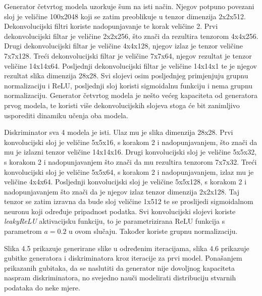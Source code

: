 \documentclass[times, utf8, diplomski]{fer}
\begin{document}
Generator četvrtog modela uzorkuje šum na isti način. Njegov potpuno povezani sloj je veličine 100x2048 koji se zatim preoblikuje u tenzor dimenzija 2x2x512. Dekonvolucijski filtri koriste nadopunjavanje te korak veličine 2. Prvi dekonvolucijski filtar je veličine 2x2x256, što znači da rezultira tenzorom 4x4x256. Drugi dekonvolucijski filtar je veličine 4x4x128, njegov izlaz je tenzor veličine 7x7x128. Treći dekonvolucijski filtar je veličine 7x7x64, njegov rezultat je tenzor veličine 14x14x64. Posljednji dekonvolucijski filtar je veličine 14x14x1 te je njegov rezultat slika dimenzija 28x28. Svi slojevi osim posljednjeg primjenjuju grupnu normalizaciju i ReLU, posljednji sloj koristi sigmoidalnu funkciju i nema grupnu normalizaciju. Generator četvrtog modela je nešto većeg kapaciteta od generatora prvog modela, te koristi više dekonvolucijskih slojeva stoga će bit zanimljivo usporediti dinamiku učenja oba modela. \par

Diskriminator sva 4 modela je isti. Ulaz mu je slika dimenzija 28x28. Prvi konvolucijski sloj je veličine 5x5x16, s korakom 2 i nadopunjavanjem, što znači da mu je izlazni tenzor veličine 14x14x16. Drugi konvolucijski sloj je veličine 5x5x32, s korakom 2 i nadopunjavanjem što znači da mu rezultira tenzorom 7x7x32. Treći konvolucijski sloj je veličine 5x5x64, s korakom 2 i nadopunjavanjem, izlaz mu je veličine 4x4x64. Posljednji konvolucijski sloj je veličine 5x5x128, s korakom 2 i nadopunjavanjem što znači da je njegov izlaz tenzor dimenzija 2x2x128. Taj tenzor se zatim izravna da bude sloj veličine 1x512 te se proslijedi sigmoidalnom neuronu koji određuje pripadnost podatka. Svi konvolucijski slojevi koriste \textit{leakyReLU} aktivacijsku funkciju, to je parametrizirana ReLU funkcija s parametrom $a=0.2$ u ovom slučaju. Također koriste grupnu normalizaciju. \par

Slika 4.5 prikazuje generirane slike u određenim iteracijama, slika 4.6 prikazuje gubitke generatora i diskriminatora kroz iteracije za prvi model. Ponašanjem prikazanih gubitaka, da se naslutiti da generator nije dovoljnog kapaciteta naspram diskriminatora, no svejedno nauči modelirati distribuciju stvarnih podataka do neke mjere. \par
\end{document}
